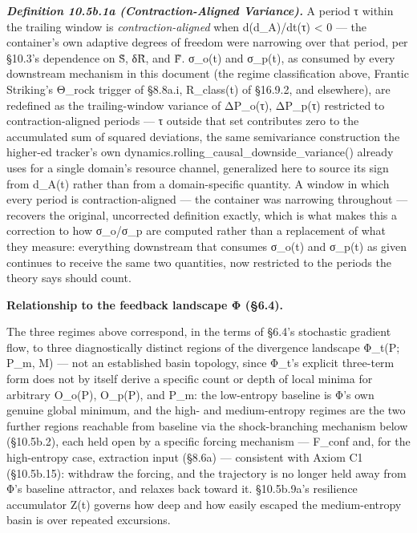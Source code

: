 \documentclass[
]{article}
\begin{document}
\emph{\textbf{Definition 10.5b.1a (Contraction-Aligned Variance).}} A
period τ within the trailing window is \emph{contraction-aligned} when
d(d\_A)/dt(τ) \textless{} 0 --- the container's own adaptive degrees of
freedom were narrowing over that period, per §10.3's dependence on S̃,
δR̃, and F̃. σ\_o(t) and σ\_p(t), as consumed by every downstream
mechanism in this document (the regime classification above, Frantic
Striking's Θ\_rock trigger of §8.8a.i, R\_class(t) of §16.9.2, and
elsewhere), are redefined as the trailing-window variance of ΔP\_o(τ),
ΔP\_p(τ) restricted to contraction-aligned periods --- τ outside that
set contributes zero to the accumulated sum of squared deviations, the
same semivariance construction the higher-ed tracker's own
dynamics.rolling\_causal\_downside\_variance() already uses for a single
domain's resource channel, generalized here to source its sign from
d\_A(t) rather than from a domain-specific quantity. A window in which
every period is contraction-aligned --- the container was narrowing
throughout --- recovers the original, uncorrected definition exactly,
which is what makes this a correction to how σ\_o/σ\_p are computed
rather than a replacement of what they measure: everything downstream
that consumes σ\_o(t) and σ\_p(t) as given continues to receive the same
two quantities, now restricted to the periods the theory says should
count.

\textbf{Relationship to the feedback landscape Φ (§6.4).}

The three regimes above correspond, in the terms of §6.4's stochastic
gradient flow, to three diagnostically distinct regions of the
divergence landscape Φ\_t(P; P\_m, M) --- not an established basin
topology, since Φ\_t's explicit three-term form does not by itself
derive a specific count or depth of local minima for arbitrary O\_o(P),
O\_p(P), and P\_m: the low-entropy baseline is Φ's own genuine global
minimum, and the high- and medium-entropy regimes are the two further
regions reachable from baseline via the shock-branching mechanism below
(§10.5b.2), each held open by a specific forcing mechanism --- F\_conf
and, for the high-entropy case, extraction input (§8.6a) --- consistent
with Axiom C1 (§10.5b.15): withdraw the forcing, and the trajectory is
no longer held away from Φ's baseline attractor, and relaxes back toward
it. §10.5b.9a's resilience accumulator Z(t) governs how deep and how
easily escaped the medium-entropy basin is over repeated excursions.
\end{document}
